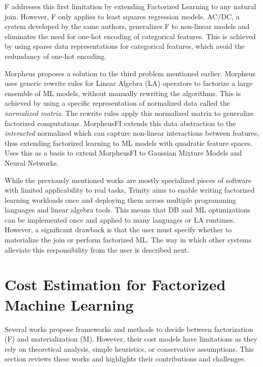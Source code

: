 F \cite{f_schleich} addresses this first limitation by extending Factorized Learning to any natural join. However, F only applies to least squares regression models. AC/DC, a system developed by the same authors, generalizes F to non-linear models and eliminates the need for one-hot encoding of categorical features. This is achieved by using sparse data representations for categorical features, which avoid the redundancy of one-hot encoding.

Morpheus \cite{morpheus} proposes a solution to the third problem mentioned earlier. Morpheus uses generic rewrite rules for Linear Algebra (LA) operators to factorize a large ensemble of ML models, without manually rewriting the algorithms. This is achieved by using a specific representation of normalized data called the \textit{normalized matrix}. The rewrite rules apply this normalized matrix to generalize factorized computations. MorpheusFI \cite{MorpheusFI} extends this data abstraction to the \textit{interacted} normalized which can capture non-linear interactions between features, thus extending factorized learning to ML models with quadratic feature spaces. \cite{f_gmm_DBLP:conf/icde/ChengKZ021} Uses this as a basis to extend MorpheusFI to Gaussian Mixture Models and Neural Networks.

While the previously mentioned works are mostly specialized pieces of software with limited applicability to real tasks, Trinity \cite{TrinityPolyglotFrameworkFactorized2021} aims to enable writing factorized learning workloads once and deploying them across multiple programming languages and linear algebra tools. This means that DB and ML optimizations can be implemented once and applied to many languages or LA runtimes. However, a significant drawback is that the user must specify whether to materialize the join or perform factorized ML. The way in which other systems alleviate this responsibility from the user is described next.

\section{Cost Estimation for Factorized Machine Learning}
\label{sec:3-cost-estimation-for-factorized-ml}
Several works propose frameworks and methods to decide between factorization (F) and materialization (M). However, their cost models have limitations as they rely on theoretical analysis, simple heuristics, or conservative assumptions. This section reviews these works and highlights their contributions and challenges.

